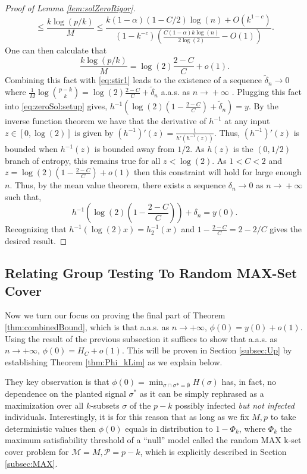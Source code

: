 \documentclass[12pt,reqno]{amsart}
\numberwithin{equation}{section}
\theoremstyle{definition}
\newcommand{\conv}[1]{\overset{#1}{\rightarrow}}
\renewcommand{\[}{\begin{equation}}
\renewcommand{\]}{\end{equation}}
\renewcommand{\|}{\bigg{|}}
\newcommand{\kset}{random MAX k-set cover }
\newcommand{\ngrow}{\ensuremath{n \conv{} +\infty} }
\newcommand{\mSet}{\mathcal{M}}
\newcommand{\pSet}{\mathcal{P}}
\newcommand{\err}{c}
\begin{document}
\begin{proof}[Proof of Lemma \ref{lem:solZeroRigor}]
\[        \leq \frac{k\log(p/k)}{M} \leq \frac{k(1-\alpha)(1-C/2)\log(n) + O(k^{1-\err})}{(1- k^{-\err})\left(\frac{C(1-\alpha)k\log(n)}{2\log(2)} - O(1)\right)}.\]
        One can then calculate that
        \[\frac{k\log(p/k)}{M} = \log(2)\frac{2-C}{C} + o(1).\]
        Combining this fact with \eqref{eq:stir1} leads to the existence of a sequence $\tilde{\delta}_n \conv{} 0$ where $\frac{1}{M}\log\binom{p-k}{k} = \log(2)\frac{2-C}{C} + \tilde{\delta}_n$ a.a.s. as \ngrow\!. Plugging this fact into \eqref{eq:zeroSol:setup} gives, $h^{-1}\left(\log(2)\left(1-\frac{2-C}{C}\right) + \tilde{\delta}_n\right) = y$.
        By the inverse function theorem we have that the derivative of $h^{-1}$ at any input $z\in [0,\log(2)]$ is given by $(h^{-1})'(z) = \frac{1}{h'(h^{-1}(z))}$.
        Thus, $(h^{-1})'(z)$ is bounded when $h^{-1}(z)$ is bounded away from $1/2$. As $h(z)$ is the $(0,1/2)$ branch of entropy, this remains true for all $z < \log(2)$. As $1<C<2$ and $z = \log(2)(1-\frac{2-C}{C}) + o(1)$ then this constraint will hold for large enough $n$. Thus, by the mean value theorem, there exists a sequence $\delta_n \conv{} 0$ as \ngrow such that,
        \[h^{-1}\left(\log(2)\left(1-\frac{2-C}{C}\right)\right) + \delta_n = y(0).\]
        Recognizing that $h^{-1}(\log(2)x) = h_2^{-1}(x)$ and $1- \frac{2-C}{C} = 2-2/C$ gives the desired result.

      
\end{proof}

\subsection{Relating Group Testing To Random MAX-Set Cover}\label{subsec:relate}

Now we turn our focus on proving the final part of Theorem \ref{thm:combinedBound}, which is that a.a.s. as $n \rightarrow +\infty$, $\phi(0)=y(0)+o(1)$. Using the result of the previous subsection it suffices to show that a.a.s. as $n \rightarrow +\infty$, $\phi(0)=H_C+o(1).$ This will be proven in Section \ref{subsec:Up} by establishing Theorem \ref{thm:Phi_kLim} as we explain below.

They key observation is that $\phi(0)=\min_{\sigma \cap \sigma*=\emptyset} H(\sigma)$ has, in fact, no dependence on the planted signal $\sigma^*$ as it can be simply rephrased as a maximization over all $k$-subsets $\sigma$ of the $p-k$ possibly infected \emph{but not infected} individuals. Interestingly, it is for this reason that as long as we fix $M,p$ to take deterministic values then $\phi(0)$ equals in distribution to $1-\Phi_k$, where $\Phi_k$ the maximum satisfiability threshold of a ``null'' model called the \kset problem for $\mSet=M,\pSet=p-k$, which is explicitly described in Section \ref{subsec:MAX}.
\end{document}
